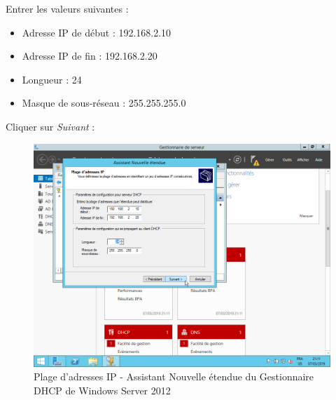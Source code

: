 \newpage
Entrer les valeurs suivantes :
\begin{itemize}
    \item Adresse IP de début : 192.168.2.10
    \item Adresse IP de fin : 192.168.2.20
    \item Longueur : 24
    \item Masque de sous-réseau : 255.255.255.0
\end{itemize}
Cliquer sur \textit{Suivant} :
\begin{figure}[h!]
    \begin{center}
        \includegraphics[scale=0.6]{WS2012_Screenshots/44.png}
        \caption{Plage d'adresses IP - Assistant Nouvelle étendue du Gestionnaire DHCP de Windows Server 2012}
        \label{WS2012_Screenshots/44}
    \end{center}
\end{figure}
\FloatBarrier

